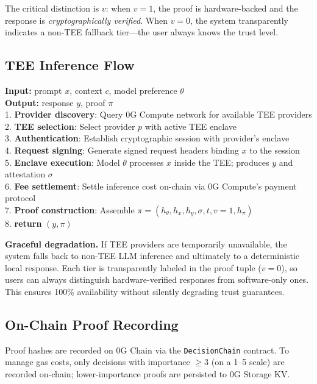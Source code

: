\documentclass[10pt,a4paper]{article}
\theoremstyle{definition}
\theoremstyle{plain}
\begin{document}
The critical distinction is $v$: when $v{=}1$, the proof is hardware-backed and the response is \emph{cryptographically verified}. When $v{=}0$, the system transparently indicates a non-TEE fallback tier---the user always knows the trust level.

\subsection{TEE Inference Flow}

\begin{algbox}
\footnotesize
\textbf{Input:} prompt $x$, context $c$, model preference $\theta$ \\
\textbf{Output:} response $y$, proof $\pi$ \\[4pt]
1. \textbf{Provider discovery}: Query 0G Compute network for available TEE providers \\
2. \textbf{TEE selection}: Select provider $p$ with active TEE enclave \\
3. \textbf{Authentication}: Establish cryptographic session with provider's enclave \\
4. \textbf{Request signing}: Generate signed request headers binding $x$ to the session \\
5. \textbf{Enclave execution}: Model $\theta$ processes $x$ inside the TEE; produces $y$ and attestation $\sigma$ \\
6. \textbf{Fee settlement}: Settle inference cost on-chain via 0G Compute's payment protocol \\
7. \textbf{Proof construction}: Assemble $\pi = (h_\theta, h_x, h_y, \sigma, t, v{=}1, h_\pi)$ \\
8. \textbf{return} $(y, \pi)$
\end{algbox}

\noindent\textbf{Graceful degradation.} If TEE providers are temporarily unavailable, the system falls back to non-TEE LLM inference and ultimately to a deterministic local response. Each tier is transparently labeled in the proof tuple ($v{=}0$), so users can always distinguish hardware-verified responses from software-only ones. This ensures 100\% availability without silently degrading trust guarantees.

\subsection{On-Chain Proof Recording}

Proof hashes are recorded on 0G Chain via the \texttt{DecisionChain} contract. To manage gas costs, only decisions with importance $\geq 3$ (on a 1--5 scale) are recorded on-chain; lower-importance proofs are persisted to 0G Storage KV.
\end{document}
